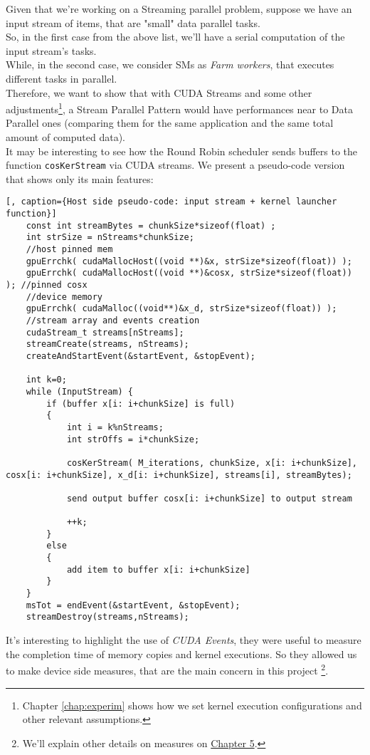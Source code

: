 	Given that we're working on a Streaming parallel problem, suppose we have an input stream of items, that are "small" data parallel tasks.\\
	So, in the first case from the above list, we'll have a serial computation of the input stream's tasks.\\
	While, in the second case, we consider SMs as \textit{Farm workers}, that executes different tasks in parallel.\\
	Therefore, we want to show that with CUDA Streams and some other adjustments\footnote{Chapter \ref{chap:experim} shows how we set kernel execution configurations and other relevant assumptions.}, a Stream Parallel Pattern would have performances near to Data Parallel ones (comparing them for the same application and the same total amount of computed data).\\
	
	It may be interesting to see how the Round Robin scheduler sends buffers to the function \texttt{cosKerStream} via CUDA streams. We present a pseudo-code version that shows only its main features:
	\begin{lstlisting}[, caption={Host side pseudo-code: input stream + kernel launcher function}]
	const int streamBytes = chunkSize*sizeof(float) ;
	int strSize = nStreams*chunkSize;	
	//host pinned mem
	gpuErrchk( cudaMallocHost((void **)&x, strSize*sizeof(float)) ); 
	gpuErrchk( cudaMallocHost((void **)&cosx, strSize*sizeof(float)) ); //pinned cosx
	//device memory	
	gpuErrchk( cudaMalloc((void**)&x_d, strSize*sizeof(float)) );
	//stream array and events creation 
	cudaStream_t streams[nStreams];
	streamCreate(streams, nStreams);
	createAndStartEvent(&startEvent, &stopEvent);
	
	int k=0;
	while (InputStream) {  
		if (buffer x[i: i+chunkSize] is full)
		{
			int i = k%nStreams;
			int strOffs = i*chunkSize;
			
			cosKerStream( M_iterations, chunkSize, x[i: i+chunkSize], cosx[i: i+chunkSize], x_d[i: i+chunkSize], streams[i], streamBytes);     
			   
			send output buffer cosx[i: i+chunkSize] to output stream
			
			++k;
		}
		else
		{
			add item to buffer x[i: i+chunkSize]
		}	
	} 
	msTot = endEvent(&startEvent, &stopEvent);
	streamDestroy(streams,nStreams); 	
	\end{lstlisting}
	It's interesting to highlight the use of \textit{CUDA Events}, they were useful to measure the completion time of memory copies and kernel executions. So they allowed us to make device side measures, that are the main concern in this project \footnote{We'll explain other details on measures on \hyperref[chap:experim]{Chapter 5}.}.
	
